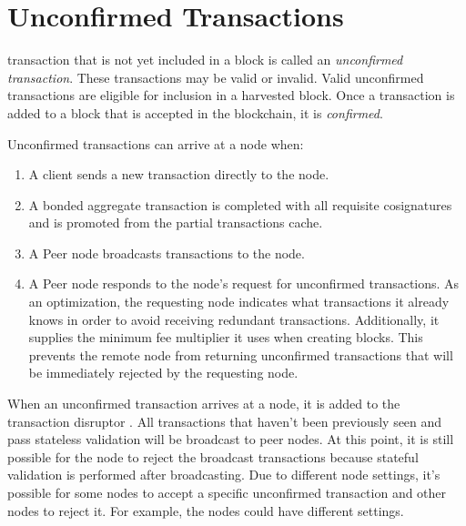 \section{Unconfirmed Transactions}
\label{sec:unconfirmedTransactions}


 transaction that is not yet included in a block is called an \emph{unconfirmed transaction}.
These transactions may be valid or invalid.
Valid unconfirmed transactions are eligible for inclusion in a harvested block.
Once a transaction is added to a block that is accepted in the blockchain, it is \emph{confirmed}.

Unconfirmed transactions can arrive at a node when:
\begin{enumerate}
	\item{A client sends a new transaction directly to the node.}
	\item{A bonded aggregate transaction is completed with all requisite cosignatures and is promoted from the partial transactions cache.}
	\item{A Peer node broadcasts transactions to the node.}
	\item{
		A Peer node responds to the node's request for unconfirmed transactions.
		As an optimization, the requesting node indicates what transactions it already knows in order to avoid receiving redundant transactions.
		Additionally, it supplies the minimum fee multiplier  it uses when creating blocks.
		This prevents the remote node from returning unconfirmed transactions that will be immediately rejected by the requesting node.
	}
\end{enumerate}

When an unconfirmed transaction arrives at a node, it is added to the transaction disruptor .
All transactions that haven't been previously seen and pass stateless validation will be broadcast to peer nodes.
At this point, it is still possible for the node to reject the broadcast transactions because stateful validation is performed after broadcasting.
Due to different node settings, it's possible for some nodes to accept a specific unconfirmed transaction and other nodes to reject it.
For example, the nodes could have different  settings.

